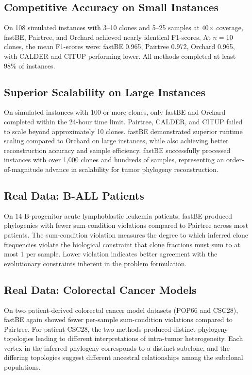 \documentclass[11pt]{article}
\begin{document}
\subsection{Competitive Accuracy on Small Instances}

On 108 simulated instances with 3--10 clones and 5--25 samples at 40$\times$ coverage, fastBE, Pairtree, and Orchard achieved nearly identical F1-scores. At $n = 10$ clones, the mean F1-scores were: fastBE 0.965, Pairtree 0.972, Orchard 0.965, with CALDER and CITUP performing lower. All methods completed at least 98\% of instances.

\subsection{Superior Scalability on Large Instances}

On simulated instances with 100 or more clones, only fastBE and Orchard completed within the 24-hour time limit. Pairtree, CALDER, and CITUP failed to scale beyond approximately 10 clones. fastBE demonstrated superior runtime scaling compared to Orchard on large instances, while also achieving better reconstruction accuracy and sample efficiency. fastBE successfully processed instances with over 1,000 clones and hundreds of samples, representing an order-of-magnitude advance in scalability for tumor phylogeny reconstruction.

\subsection{Real Data: B-ALL Patients}

On 14 B-progenitor acute lymphoblastic leukemia patients, fastBE produced phylogenies with fewer sum-condition violations compared to Pairtree across most patients. The sum-condition violation measures the degree to which inferred clone frequencies violate the biological constraint that clone fractions must sum to at most 1 per sample. Lower violation indicates better agreement with the evolutionary constraints inherent in the problem formulation.

\subsection{Real Data: Colorectal Cancer Models}

On two patient-derived colorectal cancer model datasets (POP66 and CSC28), fastBE again showed fewer per-sample sum-condition violations compared to Pairtree. For patient CSC28, the two methods produced distinct phylogeny topologies leading to different interpretations of intra-tumor heterogeneity. Each vertex in the inferred phylogeny corresponds to a distinct subclone, and the differing topologies suggest different ancestral relationships among the subclonal populations.
\end{document}
